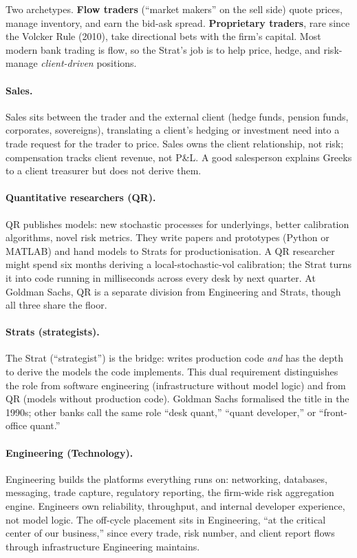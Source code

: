 Two archetypes.  \textbf{Flow traders} (``market makers'' on the
sell side) quote prices, manage inventory, and earn the bid-ask
spread.  \textbf{Proprietary traders}, rare since the Volcker Rule
(2010), take directional bets with the firm's capital.  Most
modern bank trading is flow, so the Strat's job is to help price,
hedge, and risk-manage \emph{client-driven} positions.

\paragraph{Sales.}
Sales sits between the trader and the external client (hedge funds,
pension funds, corporates, sovereigns), translating a client's
hedging or investment need into a trade request for the trader to
price.  Sales owns the client relationship, not risk; compensation
tracks client revenue, not P\&L.  A good salesperson explains Greeks
to a client treasurer but does not derive them.

\paragraph{Quantitative researchers (QR).}
QR publishes models: new stochastic processes for underlyings,
better calibration algorithms, novel risk metrics.  They write
papers and prototypes (Python or MATLAB) and hand models to Strats
for productionisation.  A QR researcher might spend six months
deriving a local-stochastic-vol calibration; the Strat turns it
into code running in milliseconds across every desk by next
quarter.  At Goldman Sachs, QR is a separate division from
Engineering and Strats, though all three share the floor.

\paragraph{Strats (strategists).}
The Strat (``strategist'') is the bridge: writes production code
\emph{and} has the depth to derive the models the code implements.
This dual requirement distinguishes the role from software
engineering (infrastructure without model logic) and from QR (models
without production code).  Goldman Sachs formalised the title in
the 1990s; other banks call the same role ``desk quant,'' ``quant
developer,'' or ``front-office quant.''

\paragraph{Engineering (Technology).}
Engineering builds the platforms everything runs on: networking,
databases, messaging, trade capture, regulatory reporting, the
firm-wide risk aggregation engine.  Engineers own reliability,
throughput, and internal developer experience, not model logic.
The off-cycle placement sits in Engineering, ``at the critical
center of our business,'' since every trade, risk number, and
client report flows through infrastructure Engineering maintains.

